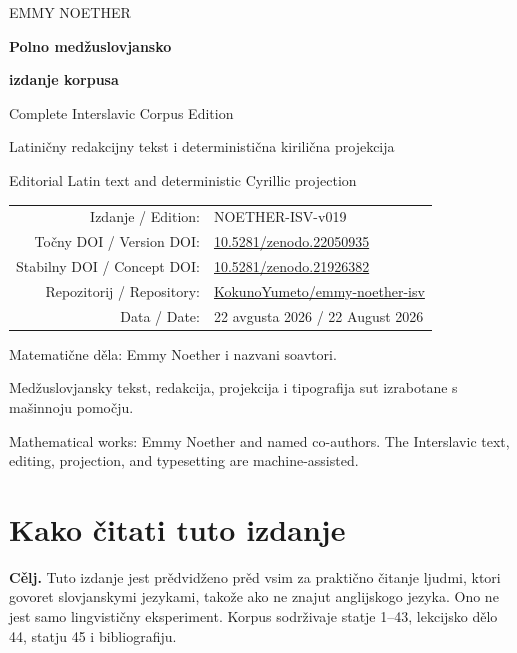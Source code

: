 \documentclass[11pt]{article}
\newcommand{\doiurl}[1]{\href{https://doi.org/#1}{#1}}
\newcommand{\repo}{\href{https://github.com/KokunoYumeto/emmy-noether-isv}{KokunoYumeto/emmy-noether-isv}}
\begin{document}
\thispagestyle{empty}
\begin{center}
\vspace*{1.2cm}
{\sffamily\color{NoetherBlue}\Large EMMY NOETHER\par}
\vspace{1.3cm}
{\sffamily\bfseries\Huge Polno medžuslovjansko\par}
{\sffamily\bfseries\Huge izdanje korpusa\par}
\vspace{0.55cm}
{\sffamily\Large Complete Interslavic Corpus Edition\par}
\vspace{1.2cm}
{\large Latiničny redakcijny tekst i deterministična kirilična projekcija\par}
{\large Editorial Latin text and deterministic Cyrillic projection\par}
\vfill
\begin{tabular}{@{}rl@{}}
Izdanje / Edition: & NOETHER-ISV-v019\\
Točny DOI / Version DOI: & \doiurl{10.5281/zenodo.22050935}\\
Stabilny DOI / Concept DOI: & \doiurl{10.5281/zenodo.21926382}\\
Repozitorij / Repository: & \repo\\
Data / Date: & 22 avgusta 2026 / 22 August 2026
\end{tabular}
\vfill
{\small Matematične děla: Emmy Noether i nazvani soavtori.\par}
{\small Medžuslovjansky tekst, redakcija, projekcija i tipografija sut izrabotane s mašinnoju pomočju.\par}
{\small Mathematical works: Emmy Noether and named co-authors. The Interslavic text, editing, projection, and typesetting are machine-assisted.\par}
\end{center}
\clearpage

\section*{Kako čitati tuto izdanje}

\textbf{Cělj.} Tuto izdanje jest prědvidženo prěd vsim za praktično čitanje ljudmi, ktori govoret slovjanskymi jezykami, takože ako ne znajut anglijskogo jezyka. Ono ne jest samo lingvističny eksperiment. Korpus sodrživaje statje 1--43, lekcijsko dělo 44, statju 45 i bibliografiju.
\end{document}
